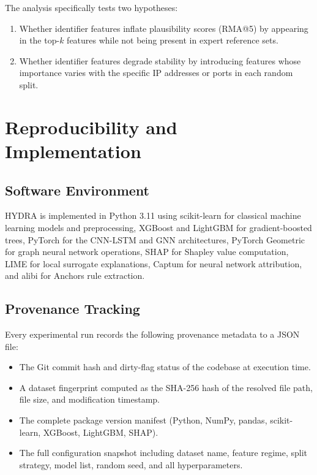 \documentclass[12pt,a4paper]{report}
\begin{document}
The analysis specifically tests two hypotheses:
\begin{enumerate}
  \item Whether identifier features inflate plausibility scores (RMA@5) by appearing in the top-$k$ features while not being present in expert reference sets.
  \item Whether identifier features degrade stability by introducing features whose importance varies with the specific IP addresses or ports in each random split.
\end{enumerate}

\section{Reproducibility and Implementation}
\label{sec:implementation}

\subsection{Software Environment}
\label{sec:software}

HYDRA is implemented in Python 3.11 using scikit-learn for classical machine learning models and preprocessing, XGBoost and LightGBM for gradient-boosted trees, PyTorch for the CNN-LSTM and GNN architectures, PyTorch Geometric for graph neural network operations, SHAP for Shapley value computation, LIME for local surrogate explanations, Captum for neural network attribution, and alibi for Anchors rule extraction.

\subsection{Provenance Tracking}
\label{sec:provenance}

Every experimental run records the following provenance metadata to a JSON file:
\begin{itemize}
  \item The Git commit hash and dirty-flag status of the codebase at execution time.
  \item A dataset fingerprint computed as the SHA-256 hash of the resolved file path, file size, and modification timestamp.
  \item The complete package version manifest (Python, NumPy, pandas, scikit-learn, XGBoost, LightGBM, SHAP).
  \item The full configuration snapshot including dataset name, feature regime, split strategy, model list, random seed, and all hyperparameters.
\end{itemize}
\end{document}
